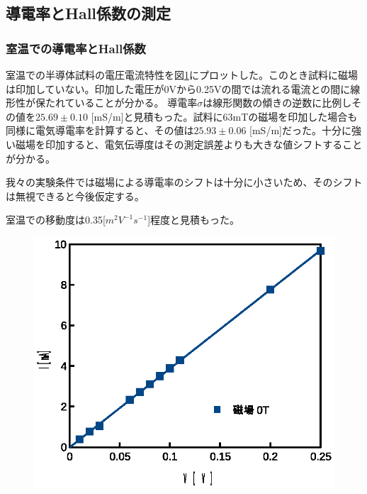 \documentclass[11pt,a4]{jarticle}
\begin{document}
\subsection{導電率とHall係数の測定}

\subsubsection{室温での導電率とHall係数}
室温での半導体試料の電圧電流特性を図\ref{fig:conductivity_RT}にプロットした。このとき試料に磁場は印加していない。印加した電圧が0Vから0.25Vの間では流れる電流との間に線形性が保たれていることが分かる。
導電率$\sigma$は線形関数の傾きの逆数に比例しその値を$25.69\pm0.10$ [mS/m]と見積もった。試料に63mTの磁場を印加した場合も同様に電気導電率を計算すると、その値は$25.93\pm0.06$ [mS/m]だった。十分に強い磁場を印加すると、電気伝導度はその測定誤差よりも大きな値シフトすることが分かる。

我々の実験条件では磁場による導電率のシフトは十分に小さいため、そのシフトは無視できると今後仮定する。

室温での移動度は0.35[$m^2V^{-1}s^{-1}$]程度と見積もった。

\begin{figure}[!htbp]
   \begin{center}
    \includegraphics[width=0.5\hsize]{./conductivity_RT.eps}
    \caption{}
     \label{fig:conductivity_RT}
   \end{center}
\end{figure}
\end{document}

